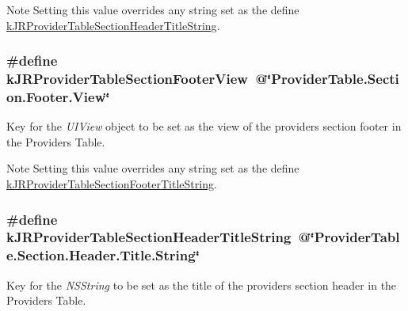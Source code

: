 \begin{DoxyNote}{Note}
Setting this value overrides any string set as the define \hyperlink{group__custom_interface_ga667a6c955993ec24292875f319a7d763}{kJRProviderTableSectionHeaderTitleString}. 
\end{DoxyNote}
\hypertarget{group__custom_interface_ga984c096e9258dea402a1c27ae8bb6c8f}{
\subsubsection[{kJRProviderTableSectionFooterView}]{\setlength{\rightskip}{0pt plus 5cm}\#define kJRProviderTableSectionFooterView~@\char`\"{}ProviderTable.Section.Footer.View\char`\"{}}}
\label{group__custom_interface_ga984c096e9258dea402a1c27ae8bb6c8f}
Key for the {\itshape UIView\/} object to be set as the view of the providers section footer in the Providers Table.

\begin{DoxyNote}{Note}
Setting this value overrides any string set as the define \hyperlink{group__custom_interface_ga72e63105251e7d4d6a363e279c2bf775}{kJRProviderTableSectionFooterTitleString}. 
\end{DoxyNote}
\hypertarget{group__custom_interface_ga667a6c955993ec24292875f319a7d763}{
\subsubsection[{kJRProviderTableSectionHeaderTitleString}]{\setlength{\rightskip}{0pt plus 5cm}\#define kJRProviderTableSectionHeaderTitleString~@\char`\"{}ProviderTable.Section.Header.Title.String\char`\"{}}}
\label{group__custom_interface_ga667a6c955993ec24292875f319a7d763}
Key for the {\itshape NSString\/} to be set as the title of the providers section header in the Providers Table.

